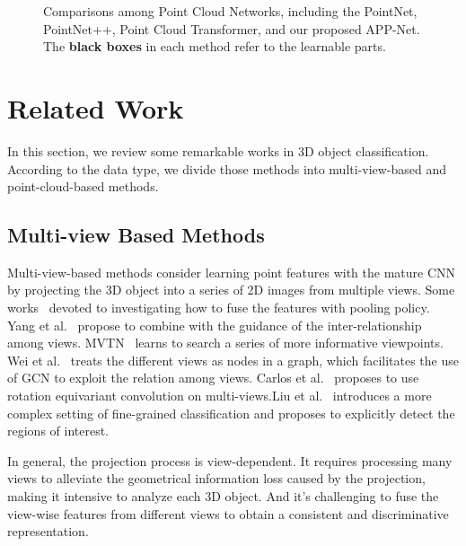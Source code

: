 \documentclass[journal]{IEEEtran}
\begin{document}
\begin{figure*}[t]
\begin{center}
\end{center}
\vspace{-0.3cm}
   \caption{Comparisons among Point Cloud Networks, including the PointNet, PointNet++, Point Cloud Transformer, and our proposed APP-Net. The \textcolor[RGB]{0,0,0}{\bf black boxes} in each method refer to the learnable parts.}
\label{fig:pointnetwork}
\end{figure*}

\section{Related Work}
In this section, we review some remarkable works in 3D object classification. According to the data type, we divide those methods into multi-view-based and point-cloud-based methods.

\subsection{Multi-view Based Methods}
Multi-view-based methods consider learning point features with the mature CNN by projecting the 3D object into a series of 2D images from multiple views. Some works~\cite{mvcnn,mvc1,yu2018multi,yang2019learning,sun2020drcnn,feng2018gvcnn,chen2018veram} devoted to investigating how to fuse the features with pooling policy. Yang et al.~\cite{mvc3} propose to combine with the guidance of the inter-relationship among views. MVTN~\cite{hamdi2021mvtn} learns to search a series of more informative viewpoints. Wei et al.~\cite{mvc2} treats the different views as nodes in a graph, which facilitates the use of GCN to exploit the relation among views. 
Carlos et al.~\cite{esteves2019equivariant} proposes to use rotation equivariant convolution on multi-views.Liu et al.~\cite{DBLP:journals/tip/LiuHLZ21} introduces a more complex setting of fine-grained classification and proposes to explicitly detect the regions of interest. 

In general, the projection process is view-dependent. It requires processing many views to alleviate the geometrical information loss caused by the projection, making it intensive to analyze each 3D object. And it's challenging to fuse the view-wise features from different views to obtain a consistent and discriminative representation.
\end{document}
